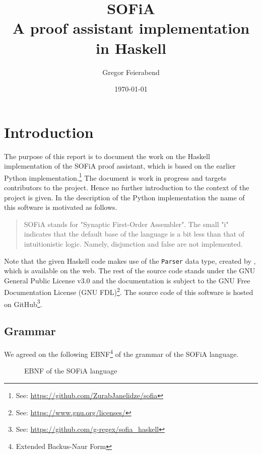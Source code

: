 \documentclass[notitlepage]{report}
\title{SOFiA\\
\large A proof assistant implementation in Haskell}
\author{Gregor Feierabend}
\date{\today}
\newcommand\m[1]{\texttt{#1}}
\begin{document}

\maketitle

\begingroup
\let\clearpage\relax
\tableofcontents
\endgroup

\chapter{Introduction}
The purpose of this report is to document the work on the Haskell
implementation of the SOFiA proof assistant, which is based on the earlier
Python implementation.\footnote{See: %
\url{https://github.com/ZurabJanelidze/sofia}}
The document is work in progress and targets contributors to the project. Hence
no further introduction to the context of the project is given. In the
description of the Python implementation the name of this software is motivated
as follows.
\begin{quote}
SOFiA stands for "Synaptic First-Order Assembler". The small "i" indicates that
the default base of the language is a bit less than that of intuitionistic
logic. Namely, disjunction and false are not implemented.
\end{quote}
Note that the given Haskell code  makes use of the \m{Parser} data type, created
by \textcite{Hutton}, which is available on the web. The rest of the source code
stands under the GNU General Public License v3.0 and the documentation is
subject to the GNU Free Documentation License
(GNU FDL)\footnote{See: \url{https://www.gnu.org/licenses/}}. The source code of
this software is hosted on GitHub\footnote{See:
\url{https://github.com/g-regex/sofia_haskell}}. 


\section{Grammar}
We agreed on the following EBNF\footnote{Extended Backus-Naur Form} of the
grammar of the SOFiA language.
\begin{figure}[h!]
    {\renewcommand{\arraystretch}{2.0}
    }
    \caption{EBNF of the SOFiA language}\label{fig:EBNFsofia}
\end{figure}
\end{document}
